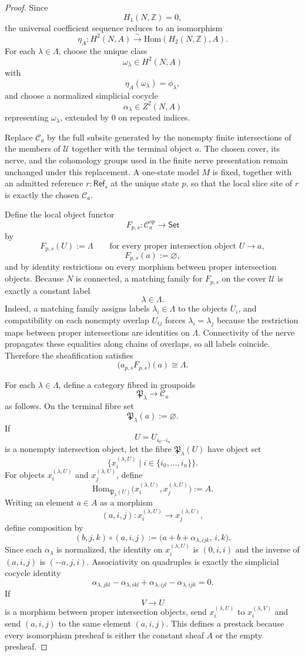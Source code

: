 \begin{proof}
Since
\[
H_1(N,\mathbb Z)=0,
\]
the universal coefficient sequence reduces to an isomorphism
\[
\eta_A:H^2(N,A)\xrightarrow{\sim}\mathrm{Hom}(H_2(N,\mathbb Z),A).
\]
For each $\lambda\in\Lambda$, choose the unique class
\[
\omega_\lambda\in H^2(N,A)
\]
with
\[
\eta_A(\omega_\lambda)=\phi_\lambda,
\]
and choose a normalized simplicial cocycle
\[
\alpha_\lambda\in Z^2(N,A)
\]
representing $\omega_\lambda$, extended by $0$ on repeated indices.

Replace $\mathcal C_a$ by the full subsite generated by the nonempty finite intersections of the members of $\mathcal U$ together with the terminal object $a$. The chosen cover, its nerve, and the cohomology groups used in the finite nerve presentation remain unchanged under this replacement. A one-state model $M$ is fixed, together with an admitted reference $r:\mathsf{Ref}_s$ at the unique state $p$, so that the local slice site of $r$ is exactly the chosen $\mathcal C_a$.

Define the local object functor
\[
F_{p,s}:\mathcal C_a^{op}\to\mathsf{Set}
\]
by
\[
F_{p,s}(U):=\Lambda
\qquad
\text{for every proper intersection object }U\to a,
\]
\[
F_{p,s}(a):=\varnothing,
\]
and by identity restrictions on every morphism between proper intersection objects. Because $N$ is connected, a matching family for $F_{p,s}$ on the cover $\mathcal U$ is exactly a constant label
\[
\lambda\in\Lambda.
\]
Indeed, a matching family assigns labels $\lambda_i\in\Lambda$ to the objects $U_i$, and compatibility on each nonempty overlap $U_{ij}$ forces $\lambda_i=\lambda_j$ because the restriction maps between proper intersections are identities on $\Lambda$. Connectivity of the nerve propagates these equalities along chains of overlaps, so all labels coincide.
Therefore the sheafification satisfies
\[
\bigl(a_{p,s}F_{p,s}\bigr)(a)\cong \Lambda.
\]

For each $\lambda\in\Lambda$, define a category fibred in groupoids
\[
\mathfrak P_\lambda\to \mathcal C_a
\]
as follows. On the terminal fibre set
\[
\mathfrak P_\lambda(a):=\varnothing.
\]
If
\[
U=U_{i_0\cdots i_n}
\]
is a nonempty intersection object, let the fibre $\mathfrak P_\lambda(U)$ have object set
\[
\{x_i^{(\lambda,U)}\mid i\in \{i_0,\dots,i_n\}\}.
\]
For objects $x_i^{(\lambda,U)}$ and $x_j^{(\lambda,U)}$, define
\[
\mathrm{Hom}_{\mathfrak P_\lambda(U)}\!\bigl(x_i^{(\lambda,U)},x_j^{(\lambda,U)}\bigr):=A.
\]
Writing an element $a\in A$ as a morphism
\[
(a,i,j):x_i^{(\lambda,U)}\to x_j^{(\lambda,U)},
\]
define composition by
\[
(b,j,k)\circ (a,i,j):=
\bigl(a+b+\alpha_{\lambda,ijk},\,i,k\bigr).
\]
Since each $\alpha_\lambda$ is normalized, the identity on $x_i^{(\lambda,U)}$ is $(0,i,i)$ and the inverse of $(a,i,j)$ is $(-a,j,i)$. Associativity on quadruples is exactly the simplicial cocycle identity
\[
\alpha_{\lambda,jkl}-\alpha_{\lambda,ikl}+\alpha_{\lambda,ijl}-\alpha_{\lambda,ijk}=0.
\]
If
\[
V\to U
\]
is a morphism between proper intersection objects, send $x_i^{(\lambda,U)}$ to $x_i^{(\lambda,V)}$ and send $(a,i,j)$ to the same element $(a,i,j)$. This defines a prestack because every isomorphism presheaf is either the constant sheaf $A$ or the empty presheaf.


\end{proof}
